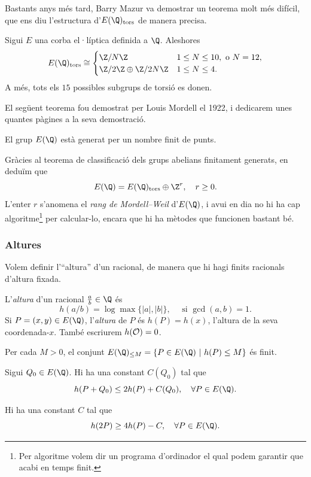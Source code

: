 Bastants anys més tard, Barry Mazur va demostrar un teorema molt més difícil, que ens diu l'estructura d'$E(\Q)_\tors$ de manera precisa.
\begin{theorem}[Mazur, 1978]
Sigui $E$ una corba el·líptica definida a $\Q$. Aleshores
\[
E(\Q)_\tors\cong\begin{cases}
\Z/N\Z & 1 \leq N \leq 10,\text{ o } N=12,\\
\Z/2\Z\oplus \Z/2N\Z & 1\leq N \leq 4.
\end{cases}
\]
A més, tots els $15$ possibles subgrups de torsió es donen.
\end{theorem}

El següent teorema fou demostrat per Louis Mordell el 1922, i dedicarem unes quantes pàgines a la seva demostració.

\begin{theorem}[Mordell, 1922]
El grup $E(\Q)$ està generat per un nombre finit de punts.
\end{theorem}

Gràcies al teorema de classificació dels grups abelians finitament generats, en deduïm que
\[
E(\Q) = E(\Q)_\tors \oplus \Z^r,\quad r\geq 0.
\]
L'enter $r$ s'anomena el \emph{rang de Mordell--Weil} d'$E(\Q)$, i avui en dia no hi ha cap algoritme\footnote{Per algoritme volem dir un programa d'ordinador el qual podem garantir que acabi en temps finit.} per calcular-lo, encara que hi ha mètodes que funcionen bastant bé.



\subsubsection{Altures}
Volem definir l'``altura'' d'un racional, de manera que hi hagi finits racionals d'altura fixada.
\begin{definition}
L'\emph{altura} d'un racional $\frac{a}{b}\in\Q$ és
\[
h(a/b) = \log \max\{|a|,|b|\},\quad\text{ si } \gcd(a,b)=1.
\]
Si $P=(x,y)\in E(\Q)$, l'\emph{altura} de $P$ és $h(P)=h(x)$, l'altura de la seva coordenada-$x$. També escriurem $h(\mathcal{O})=0$.
\end{definition}

\begin{remark}
Per cada $M>0$, el conjunt $E(\Q)_{\leq M} = \{ P\in E(\Q) ~|~ h(P) \leq M\}$ és finit.
\end{remark}

\begin{lemma}
Sigui $Q_0\in E(\Q)$. Hi ha una constant $C(Q_0)$ tal que
\[
h(P+Q_0)\leq 2h(P) + C(Q_0), \quad \forall P\in E(\Q).
\]
\end{lemma}
\begin{lemma}
Hi ha una constant $C$ tal que
\[
h(2P)\geq 4h(P) - C,\quad \forall P\in E(\Q).
\]
\end{lemma}

